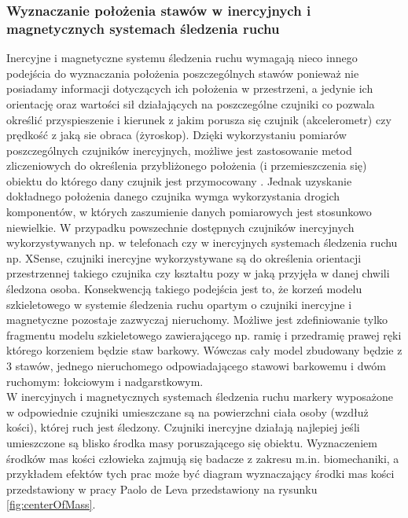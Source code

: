 	\subsubsection*{Wyznaczanie położenia stawów w inercyjnych i magnetycznych systemach śledzenia ruchu}
	Inercyjne i magnetyczne systemu śledzenia ruchu wymagają nieco innego podejścia do wyznaczania położenia poszczególnych stawów ponieważ nie posiadamy informacji dotyczących ich położenia w przestrzeni, a jedynie ich orientację oraz wartości sił działających na poszczególne czujniki co pozwala określić przyspieszenie i kierunek z jakim porusza się czujnik (akcelerometr) czy prędkość z jaką sie obraca (żyroskop). Dzięki wykorzystaniu pomiarów poszczególnych czujników inercyjnych, możliwe jest zastosowanie metod zliczeniowych do określenia przybliżonego położenia (i przemieszczenia się) obiektu do którego dany czujnik jest przymocowany \cite{HyeRiPark2009, Montorsi2013b}. Jednak uzyskanie dokładnego położenia danego czujnika wymga wykorzystania drogich komponentów, w których zaszumienie danych pomiarowych jest stosunkowo niewielkie. W przypadku powszechnie dostępnych czujników inercyjnych wykorzystywanych np. w telefonach czy w inercyjnych systemach śledzenia ruchu np. XSense, czujniki inercyjne wykorzystywane są do określenia orientacji przestrzennej takiego czujnika czy kształtu pozy w jaką przyjęła w danej chwili śledzona osoba. Konsekwencją takiego podejścia jest to, że korzeń modelu szkieletowego w systemie śledzenia ruchu opartym o czujniki inercyjne i magnetyczne pozostaje zazwyczaj nieruchomy. Możliwe jest zdefiniowanie tylko fragmentu modelu szkieletowego zawierającego np. ramię i przedramię prawej ręki którego korzeniem będzie staw barkowy. Wówczas cały model zbudowany będzie z 3 stawów, jednego nieruchomego odpowiadającego stawowi barkowemu i dwóm ruchomym: łokciowym i nadgarstkowym.\\
		
	W inercyjnych i magnetycznych systemach śledzenia ruchu markery wyposażone w odpowiednie czujniki umieszczane są na powierzchni ciała osoby (wzdłuż kości), której ruch jest śledzony. Czujniki inercyjne działają najlepiej jeśli umieszczone są blisko środka masy poruszającego się obiektu. Wyznaczeniem środków mas kości człowieka zajmują się badacze z zakresu m.in. biomechaniki, a przykładem efektów tych prac może być diagram wyznaczający środki mas kości przedstawiony w pracy Paolo de Leva \cite{DeLeva1996} przedstawiony na rysunku \ref{fig:centerOfMass}.\\
		
